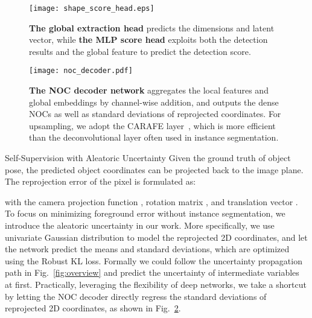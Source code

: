 \documentclass[10pt,twocolumn,letterpaper]{article}
\makeatletter
\renewcommand{\paragraph}{
  \@startsection{paragraph}{4}
  {\z@}{0.7ex \@plus .2ex \@minus .1ex}{-1em}
  {\normalfont\normalsize\bfseries}
}
\makeatother
\begin{document}
\begin{figure}[t]
\begin{center}
    \texttt{[image: shape\_score\_head.eps]}
\end{center}
   \vspace{-2mm}
   \caption{\textbf{The global extraction head} predicts the dimensions and latent vector, while \textbf{the MLP score head} exploits both the detection results and the global feature to predict the detection score.}
\label{fig:shapescore}
\end{figure}

\begin{figure}[t]
\begin{center}
    \texttt{[image: noc\_decoder.pdf]}
\end{center}
   \vspace{-2mm}
   \caption{\textbf{The NOC decoder network} aggregates the local features and global embeddings by channel-wise addition, and outputs the dense NOCs as well as standard deviations of reprojected coordinates. For upsampling, we adopt the CARAFE layer~\cite{carafe}, which is more efficient than the deconvolutional layer often used in instance segmentation. }
\label{fig:nocdecoder}
\end{figure}

\paragraph{Self-Supervision with Aleatoric Uncertainty} Given the ground truth of object pose, the predicted object coordinates can be projected back to the image plane. The reprojection error of the pixel  is formulated as:

with the camera projection function , rotation matrix , and translation vector . 
To focus on minimizing foreground error without instance segmentation, we introduce the aleatoric uncertainty in our work. More specifically, we use univariate Gaussian distribution to model the reprojected 2D coordinates, and let the network predict the means and standard deviations, which are optimized using the Robust KL loss. 
Formally we could follow the uncertainty propagation path in Fig.~\ref{fig:overview} and predict the uncertainty of intermediate variables at first. Practically, leveraging the flexibility of deep networks, we take a shortcut by letting the NOC decoder directly regress the standard deviations of reprojected 2D coordinates, as shown in Fig.~\ref{fig:nocdecoder}. 
\end{document}
